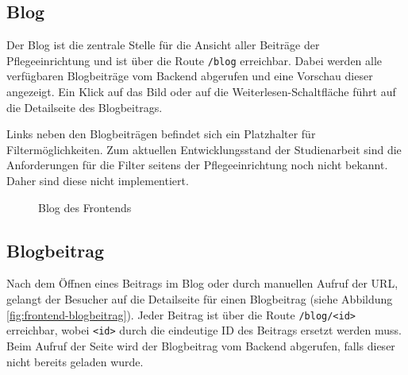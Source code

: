 %
%
\subsection{Blog}

Der Blog ist die zentrale Stelle für die Ansicht aller Beiträge der Pflegeeinrichtung und ist über die Route \lstinline{/blog} erreichbar. Dabei werden alle verfügbaren Blogbeiträge vom Backend abgerufen und eine Vorschau dieser angezeigt. Ein Klick auf das Bild oder auf die \glqq Weiterlesen\grqq{}-Schaltfläche führt auf die Detailseite des Blogbeitrags.

Links neben den Blogbeiträgen befindet sich ein Platzhalter für Filtermöglichkeiten. Zum aktuellen Entwicklungsstand der Studienarbeit sind die Anforderungen für die Filter seitens der Pflegeeinrichtung noch nicht bekannt. Daher sind diese nicht implementiert.

\begin{figure}[H]
  \setlength{\fboxsep}{0pt}
  \setlength{\fboxrule}{0.5pt}
  \centering
  \caption[Blog des Frontends]{Blog des Frontends}
  \label{fig:frontend-blog}
\end{figure}

%
%
\subsection{Blogbeitrag}

Nach dem Öffnen eines Beitrags im Blog oder durch manuellen Aufruf der URL, gelangt der Besucher auf die Detailseite für einen Blogbeitrag (siehe Abbildung \ref{fig:frontend-blogbeitrag}). Jeder Beitrag ist über die Route \lstinline{/blog/<id>} erreichbar, wobei \lstinline{<id>} durch die eindeutige ID des Beitrags ersetzt werden muss. Beim Aufruf der Seite wird der Blogbeitrag vom Backend abgerufen, falls dieser nicht bereits geladen wurde.

